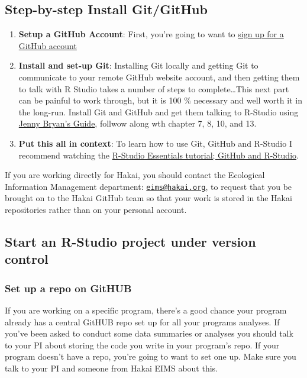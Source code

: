 \documentclass[]{book}
\begin{document}
\subsection{Step-by-step Install
Git/GitHub}\label{step-by-step-install-gitgithub}

\begin{enumerate}
\def\labelenumi{\arabic{enumi})}
\item
  \textbf{Setup a GitHub Account}: First, you're going to want to
  \href{https://github.com}{sign up for a GitHub account}
\item
  \textbf{Install and set-up Git}: Installing Git locally and getting
  Git to communicate to your remote GitHub website account, and then
  getting them to talk with R Studio takes a number of steps to
  complete\ldots{}This next part can be painful to work through, but it
  is 100 \% necessary and well worth it in the long-run. Install Git and
  GitHub and get them talking to R-Studio using
  \href{http://happygitwithr.com/install-git.html}{Jenny Bryan's Guide},
  follwow along wth chapter 7, 8, 10, and 13.
\item
  \textbf{Put this all in context}: To learn how to use Git, GitHub and
  R-Studio I recommend watching the
  \href{https://www.rstudio.com/resources/webinars/rstudio-essentials-webinar-series-managing-part-2/}{R-Studio
  Essentials tutorial; GitHub and R-Studio}.
\end{enumerate}

If you are working directly for Hakai, you should contact the Ecological
Information Management department:
\href{mailto:eims@hakai.org}{\nolinkurl{eims@hakai.org}}, to request
that you be brought on to the Hakai GitHub team so that your work is
stored in the Hakai repositories rather than on your personal account.

\subsection{Start an R-Studio project under version
control}\label{start-an-r-studio-project-under-version-control}

\subsubsection{Set up a repo on GitHUB}\label{set-up-a-repo-on-github}

If you are working on a specific program, there's a good chance your
program already has a central GitHUB repo set up for all your programs
analyses. If you've been asked to conduct some data summaries or
analyses you should talk to your PI about storing the code you write in
your program's repo. If your program doesn't have a repo, you're going
to want to set one up. Make sure you talk to your PI and someone from
Hakai EIMS about this.
\end{document}
